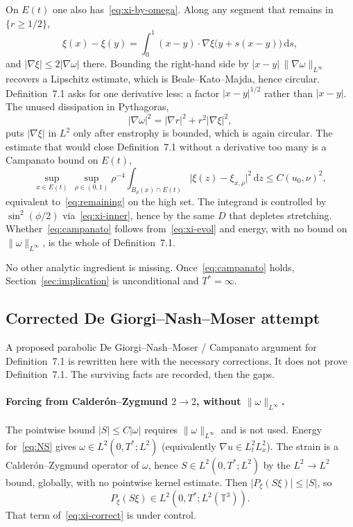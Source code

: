 \documentclass[11pt,a4paper]{article}
\theoremstyle{definition}
\theoremstyle{remark}
\newcommand{\T}{\mathbb{T}}
\newcommand{\abs}[1]{\lvert#1\rvert}
\newcommand{\norm}[1]{\lVert#1\rVert}
\newcommand{\dd}{\mathrm{d}}
\begin{document}
On \(E(t)\) one also has~\eqref{eq:xi-by-omega}. Along any segment
that remains in \(\{r\ge 1/2\}\),
\begin{equation}
\label{eq:ftc}
\xi(x)-\xi(y)
=\int_0^1 (x-y)\cdot\nabla\xi\bigl(y+s(x-y)\bigr)\,\dd s,
\end{equation}
and \(\abs{\nabla\xi}\le 2\abs{\nabla\omega}\) there. Bounding the
right-hand side by \(\abs{x-y}\,\norm{\nabla\omega}_{L^\infty}\)
recovers a Lipschitz estimate, which is Beale--Kato--Majda, hence
circular. Definition~7.1 asks for one derivative less: a factor
\(\abs{x-y}^{1/2}\) rather than \(\abs{x-y}\). The unused dissipation
in Pythagoras,
\[
\abs{\nabla\omega}^2=\abs{\nabla r}^2+r^2\abs{\nabla\xi}^2,
\]
puts \(\abs{\nabla\xi}\) in \(L^2\) only after enstrophy is bounded,
which is again circular. The estimate that would close Definition~7.1
without a derivative too many is a Campanato bound on \(E(t)\),
\begin{equation}
\label{eq:campanato}
\sup_{x\in E(t)}\,\sup_{\rho\in(0,1)}
\rho^{-4}\int_{B_\rho(x)\cap E(t)}
\abs{\xi(z)-\xi_{x,\rho}}^2\,\dd z
\le C(u_0,\nu)^2,
\end{equation}
equivalent to~\eqref{eq:remaining} on the high set. The integrand is
controlled by \(\sin^2(\phi/2)\) via~\eqref{eq:xi-inner}, hence by the
same \(D\) that depletes stretching. Whether~\eqref{eq:campanato} follows
from~\eqref{eq:xi-evol} and energy, with no bound on
\(\norm{\omega}_{L^\infty}\), is the whole of Definition~7.1.

No other analytic ingredient is missing. Once~\eqref{eq:campanato} holds,
Section~\ref{sec:implication} is unconditional and \(T^*=\infty\).

\subsection{Corrected De Giorgi--Nash--Moser attempt}
\label{sec:dnm}

A proposed parabolic De Giorgi--Nash--Moser / Campanato argument for
Definition~7.1 is rewritten here with the necessary corrections. It does
not prove Definition~7.1. The surviving facts are recorded, then the
gaps.

\paragraph{Forcing from Calder\'on--Zygmund \(2\to 2\), without \(\norm{\omega}_{L^\infty}\).}
The pointwise bound \(\abs{S}\le C\abs{\omega}\) requires
\(\norm{\omega}_{L^\infty}\) and is not used. Energy for~\eqref{eq:NS}
gives \(\omega\in L^2(0,T^*;L^2)\) (equivalently \(\nabla u\in L^2_t L^2_x\)).
The strain is a Calder\'on--Zygmund operator of \(\omega\), hence
\(S\in L^2(0,T^*;L^2)\) by the \(L^2\to L^2\) bound, globally, with no
pointwise kernel estimate. Then \(\abs{P_\xi(S\xi)}\le\abs{S}\), so
\begin{equation}
\label{eq:forcing-L2}
P_\xi(S\xi)\in L^2(0,T^*;L^2(\T^3)).
\end{equation}
That term of~\eqref{eq:xi-correct} is under control.
\end{document}
